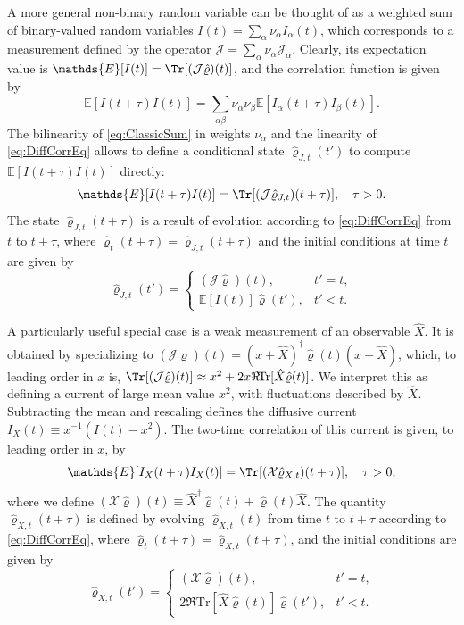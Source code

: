 \documentclass[
    11pt,
    letterpaper,
    reprint,
    notitlepage,
    superscriptaddress,
    aps,prx
]{revtex4-2}
\renewcommand{\mathbb}{\mathds}	%
\renewcommand{\t}[1]{\mathrm{#1}}
\renewcommand{\rho}{\varrho}
\newcommand{\J}{\mathcal{J}}
\newcommand{\EE}{\mathbb{E}}
\begin{document}
A more general non-binary random variable can be thought of as a weighted sum of binary-valued
random variables $I(t) = \sum_\alpha \nu_\alpha I_\alpha(t)$, which corresponds to a measurement defined by the operator $\mathcal J = \sum_\alpha \nu_\alpha \mathcal J_\alpha$.
Clearly, its expectation value is $\EE[I(t)] = \Tr[(\mathcal J \hat \rho)(t)]$,
and the correlation function is given by
\begin{equation}\label{eq:ClassicSum}
	\EE[I(t+ \tau)I(t)] = \sum_{\alpha \beta} \nu_\alpha \nu_\beta \EE[I_\alpha(t+ \tau) I_\beta(t)].
\end{equation}
The bilinearity of \cref{eq:ClassicSum} in weights $\nu_\alpha$ and the linearity of \cref{eq:DiffCorrEq} allows to define a conditional state $\hat \rho_{J, t}(t')$  
to compute $\EE[I(t+\tau)I(t)]$ directly:
\begin{equation}\label{eq:EII}
	\EE[I(t+\tau)I(t)] = \Tr[(\mathcal J \hat \rho_{J, t})(t+\tau)], \quad \tau > 0.
\end{equation}
The state $\hat \rho_{J, t}(t+\tau)$ is a result of evolution according to \cref{eq:DiffCorrEq} from $t$ to $t+\tau$, where $\hat \rho_t(t+\tau) = \hat \rho_{J, t}(t+ \tau)$ and the initial conditions at time $t$ are given by 
\begin{equation}\label{eq:RhoJ}
	\hat \rho_{J, t}(t') = 
\begin{cases}
	(\mathcal J \hat \rho)(t), &   t' = t,
	\\
	\EE[I(t)] \hat \rho(t'), & t' < t.
\end{cases}
\end{equation}


A particularly useful special case is a weak measurement of an observable $\hat{X}$.
It is obtained by specializing to 
${(\J\hat\rho)(t) = (x + \hat{X})^\dagger\hat\rho(t)(x+\hat{X})}$, which, to
leading order in $x$ is,
${\Tr[(\J\hat \rho)(t)] \approx x^2 + 2 x \Re\!\t{Tr}[\hat{X} \hat \rho(t)]}$.
We interpret this as defining a current of large mean value $x^2$, with fluctuations 
described by $\hat{X}$.
Subtracting the mean and rescaling defines the diffusive current
${I_X(t) \equiv x^{-1}(I(t)-x^2)}$.
The two-time correlation of this current is given, to leading order in $x$, by
\begin{equation}\label{eq:IXCorr}
	\EE[I_X(t+\tau)I_X(t)] = \Tr[(\mathcal X \hat\rho_{X,t})(t+\tau)], \quad \tau > 0,
\end{equation}
where we define $( \mathcal X \hat\rho)(t) \equiv \hat{X}^\dagger \hat\rho(t) + \hat\rho(t) \hat{X}$.
The quantity $\hat\rho_{X,t}(t+ \tau)$ is defined by evolving $\hat\rho_{X,t}(t)$ from time $t$ to $t+ \tau$ according to \cref{eq:DiffCorrEq}, where $\hat \rho_{t}(t+ \tau) = \hat \rho_{X, t}(t+ \tau)$, and the initial conditions are given by 
\begin{equation}\label{eq:RhoX}
	\hat \rho_{X, t}(t') = 
\begin{cases}
	(\mathcal X \hat \rho)(t), &   t' = t,
	\\
	2\Re\t{Tr}[\hat{X} \hat \rho(t)] \hat \rho(t'), & t' < t.
\end{cases}
\end{equation}
\end{document}
